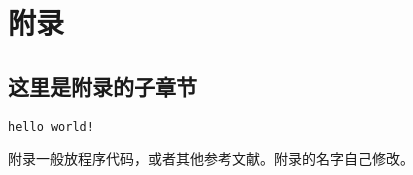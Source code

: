 \appendix
{}
\chapter*{附录}
\section{这里是附录的子章节}
\begin{spacing}{1.0}
\begin{verbatim}
hello world!
\end{verbatim}
\end{spacing}

附录一般放程序代码，或者其他参考文献。附录的名字自己修改。
